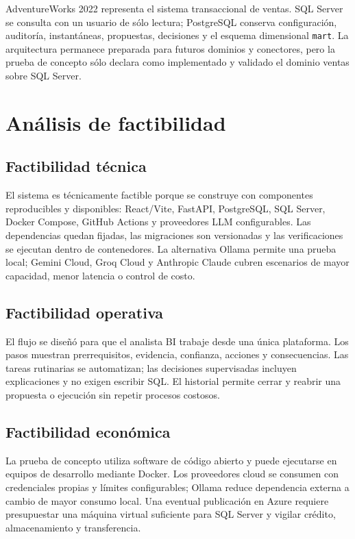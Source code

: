 \documentclass[11pt,letterpaper]{article}
\newcommand{\file}[1]{\texttt{#1}}
\begin{document}
AdventureWorks 2022 representa el sistema transaccional de ventas. SQL Server se consulta con un usuario de sólo lectura; PostgreSQL conserva configuración, auditoría, instantáneas, propuestas, decisiones y el esquema dimensional \file{mart}. La arquitectura permanece preparada para futuros dominios y conectores, pero la prueba de concepto sólo declara como implementado y validado el dominio ventas sobre SQL Server.

\section{Análisis de factibilidad}

\subsection{Factibilidad técnica}

El sistema es técnicamente factible porque se construye con componentes reproducibles y disponibles: React/Vite, FastAPI, PostgreSQL, SQL Server, Docker Compose, GitHub Actions y proveedores LLM configurables. Las dependencias quedan fijadas, las migraciones son versionadas y las verificaciones se ejecutan dentro de contenedores. La alternativa Ollama permite una prueba local; Gemini Cloud, Groq Cloud y Anthropic Claude cubren escenarios de mayor capacidad, menor latencia o control de costo.

\subsection{Factibilidad operativa}

El flujo se diseñó para que el analista BI trabaje desde una única plataforma. Los pasos muestran prerrequisitos, evidencia, confianza, acciones y consecuencias. Las tareas rutinarias se automatizan; las decisiones supervisadas incluyen explicaciones y no exigen escribir SQL. El historial permite cerrar y reabrir una propuesta o ejecución sin repetir procesos costosos.

\subsection{Factibilidad económica}

La prueba de concepto utiliza software de código abierto y puede ejecutarse en equipos de desarrollo mediante Docker. Los proveedores cloud se consumen con credenciales propias y límites configurables; Ollama reduce dependencia externa a cambio de mayor consumo local. Una eventual publicación en Azure requiere presupuestar una máquina virtual suficiente para SQL Server y vigilar crédito, almacenamiento y transferencia.
\end{document}
